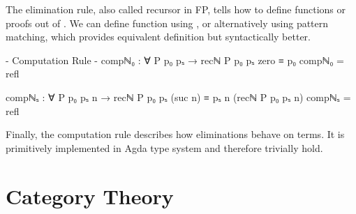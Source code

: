The elimination rule, also called recursor in FP, tells how to define functions or proofs out of . We can define function  using , or alternatively using pattern matching, which provides equivalent definition but syntactically better.

\begin{code}
{- Computation Rule -}
compℕ₀ : ∀ {P p₀ pₛ}
  → recℕ P p₀ pₛ zero ≡ p₀
compℕ₀ = refl

compℕₛ : ∀ {P p₀ pₛ n}
  → recℕ P p₀ pₛ (suc n) ≡ pₛ n (recℕ P p₀ pₛ n)
compℕₛ = refl
\end{code}

Finally, the computation rule describes how eliminations behave on terms. It is primitively implemented in Agda type system and therefore trivially hold.

\section{Category Theory}